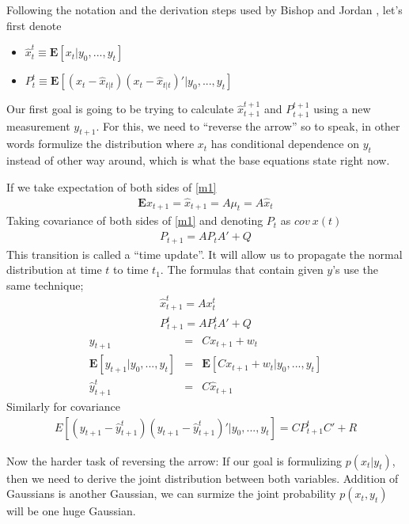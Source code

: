 \documentclass[a4paper,11pt]{article}
\begin{document}
Following the notation and the derivation steps used by Bishop and Jordan
\cite{jordan}, let's first denote

\begin{itemize}
   \item $\hat{x}_{t}^t \equiv \mathbf{E}[x_t|y_0,...,y_t]$
   \item $P_{t}^t \equiv \mathbf{E}[(x_t - \hat{x}_{t|t})(x_t -
   \hat{x}_{t|t})'|y_0,...,y_t]$ 
\end{itemize}
Our first goal is going to be trying to calculate $\hat{x}_{t+1}^{t+1}$ and
$P_{t+1}^{t+1}$ using a new measurement $y_{t+1}$. For this, we need to
``reverse the arrow'' so to speak, in other words formulize the distribution
where $x_t$ has conditional dependence on $y_t$ instead of other way around,
which is what the base equations state right now.

If we take expectation of both sides of \eqref{m1}
\begin{eqnarray*}
\mathbf{E}x_{t+1} = \hat{x}_{t+1} = A\mu_t = A\hat{x}_t
\end{eqnarray*}
Taking covariance of both sides of \eqref{m1} and denoting $P_t$ as $cov \: x(t)$
\begin{eqnarray*}
P_{t+1} = AP_{t}A' + Q
\end{eqnarray*}
This transition is called a ``time update''. It will allow us to propagate the
normal distribution at time $t$ to time $t_1$. The formulas that contain given
$y$'s use the same technique;
\begin{eqnarray*}
\hat{x}_{t+1}^t = Ax_{t}^t\\
P_{t+1}^t = AP_{t}^tA' + Q
\end{eqnarray*}
\begin{eqnarray*}
y_{t+1} &=& Cx_{t+1} + w_t\\
\mathbf{E}[y_{t+1}|y_0,...,y_t] &=& \mathbf{E}[Cx_{t+1}+w_t|y_0,...,y_t]\\
\hat{y}_{t+1}^t &=& C\hat{x}_{t+1}
\end{eqnarray*}
Similarly for covariance
\begin{eqnarray*}
E[(y_{t+1}-\hat{y}_{t+1}^t)(y_{t+1}-\hat{y}_{t+1}^t)'|y_0,...,y_t] =
CP_{t+1}^tC' + R
\end{eqnarray*}

Now the harder task of reversing the arrow: If our goal is formulizing
$p(x_t|y_t)$, then we need to derive the joint distribution between both
variables. Addition of Gaussians is another Gaussian, we can surmize the joint
probability $p(x_t,y_t)$ will be one huge Gaussian.
\end{document}
